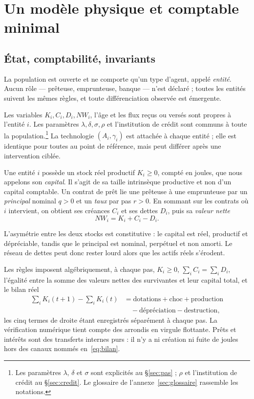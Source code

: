 \section{Un modèle physique et comptable minimal}\label{sec:modele}


\subsection{État, comptabilité, invariants}

La population est ouverte et ne comporte qu'un type d'agent, appelé
\emph{entité}. Aucun rôle --- prêteuse, emprunteuse, banque --- n'est déclaré ;
toutes les entités suivent les mêmes règles, et toute différenciation observée
est émergente.

Les variables $K_i,C_i,D_i,NW_i$, l'âge et les flux reçus ou versés sont
propres à l'entité $i$. Les paramètres $\lambda,\delta,\sigma,\rho$ et
l'institution de crédit sont communs à toute la population.\footnote{Les
paramètres $\lambda$, $\delta$ et $\sigma$ sont explicités au
§\ref{sec:pas} ; $\rho$ et l'institution de crédit au §\ref{sec:credit}.
Le glossaire de l'annexe~\ref{sec:glossaire} rassemble les notations.} La technologie
$(A_i,\gamma_i)$ est attachée à chaque entité ; elle est identique pour toutes
au point de référence, mais peut différer après une intervention ciblée.

Une entité $i$ possède un stock réel productif $K_i \ge 0$, compté en joules,
que nous appelons son \emph{capital}. Il s'agit de sa taille intrinsèque
productive et non d'un capital comptable. Un contrat de prêt lie une prêteuse
à une emprunteuse par un \emph{principal} nominal $q > 0$ et un \emph{taux}
par pas $r > 0$. En sommant sur les contrats où $i$ intervient, on obtient ses
créances $C_i$ et ses dettes $D_i$, puis sa \emph{valeur nette}
\begin{equation}
NW_i = K_i + C_i - D_i .
\label{eq:nw}
\end{equation}

L'asymétrie entre les deux stocks est constitutive : le capital est réel,
productif et dépréciable, tandis que le principal est nominal, perpétuel et
non amorti. Le réseau de dettes peut donc rester lourd alors que les actifs
réels s'érodent.

Les règles imposent algébriquement, à chaque pas, $K_i \ge 0$,
$\sum_i C_i = \sum_i D_i$, l'égalité entre la somme des valeurs nettes des
survivantes et leur capital total, et le bilan réel
\begin{equation}
\begin{split}
\sum_i K_i(t{+}1) - \sum_i K_i(t) &= \text{dotations} + \text{choc} + \text{production}\\
&\quad - \text{dépréciation} - \text{destruction},
\end{split}
\label{eq:bilan}
\end{equation}
les cinq termes de droite étant enregistrés séparément à chaque pas.
La vérification numérique tient compte des arrondis en virgule flottante.
Prêts et intérêts sont des transferts internes purs : il n'y a ni création ni
fuite de joules hors des canaux nommés en~\eqref{eq:bilan}.

